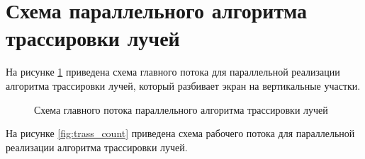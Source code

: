 \section{Схема параллельного алгоритма трассировки лучей}

На рисунке \ref{fig:trass_split} приведена схема главного потока для параллельной реализации алгоритма трассировки лучей, который разбивает экран на вертикальные участки.

\begin{figure}[h!]
	
	
	\caption{Схема главного потока параллельного алгоритма трассировки лучей}
	
	\label{fig:trass_split}
	
\end{figure}

На рисунке \ref{fig:trass_count} приведена схема рабочего потока для параллельной реализации алгоритма трассировки лучей.


